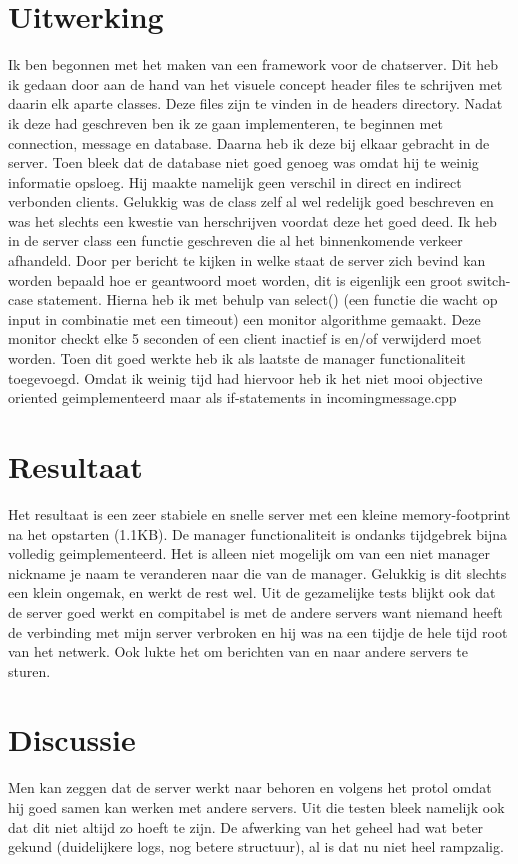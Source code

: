 \documentclass{article}
\begin{document}
\section{Uitwerking}
Ik ben begonnen met het maken van een framework voor de chatserver.
Dit heb ik gedaan door aan de hand van het visuele concept header files te schrijven met daarin elk aparte classes.
Deze files zijn te vinden in de headers directory.
Nadat ik deze had geschreven ben ik ze gaan implementeren, te beginnen met connection, message en database.
Daarna heb ik deze bij elkaar gebracht in de server.
Toen bleek dat de database niet goed genoeg was omdat hij te weinig informatie opsloeg.
Hij maakte namelijk geen verschil in direct en indirect verbonden clients.
Gelukkig was de class zelf al wel redelijk goed beschreven en was het slechts een kwestie van herschrijven voordat deze het goed deed.
Ik heb in de server class een functie geschreven die al het binnenkomende verkeer afhandeld.
Door per bericht te kijken in welke staat de server zich bevind kan worden bepaald hoe er geantwoord moet worden, dit is eigenlijk een groot switch-case statement.
Hierna heb ik met behulp van select() (een functie die wacht op input in combinatie met een timeout) een monitor algorithme gemaakt.
Deze monitor checkt elke 5 seconden of een client inactief is en/of verwijderd moet worden.
Toen dit goed werkte heb ik als laatste de manager functionaliteit toegevoegd.
Omdat ik weinig tijd had hiervoor heb ik het niet mooi objective oriented geimplementeerd maar als if-statements in incomingmessage.cpp
\section{Resultaat}
Het resultaat is een zeer stabiele en snelle server met een kleine memory-footprint na het opstarten (1.1KB). 
De manager functionaliteit is ondanks tijdgebrek bijna volledig geimplementeerd.
Het is alleen niet mogelijk om van een niet manager nickname je naam te veranderen naar die van de manager. 
Gelukkig is dit slechts een klein ongemak, en werkt de rest wel.
Uit de gezamelijke tests blijkt ook dat de server goed werkt en compitabel is met de andere servers want niemand heeft de verbinding met mijn server verbroken en hij was na een tijdje de hele tijd root van het netwerk.
Ook lukte het om berichten van en naar andere servers te sturen.
\section{Discussie}
Men kan zeggen dat de server werkt naar behoren en volgens het protol omdat hij goed samen kan werken met andere servers.
Uit die testen bleek namelijk ook dat dit niet altijd zo hoeft te zijn.
De afwerking van het geheel had wat beter gekund (duidelijkere logs, nog betere structuur), al is dat nu niet heel rampzalig.
\end{document}
